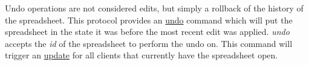 Undo operations are not considered edits, but simply a rollback of the history 
of the spreadsheet. This protocol provides an \hyperref[sec:message:undo]{undo} 
command which will put the spreadsheet in the state it was before the most 
recent edit was applied. \emph{undo} accepts the \emph{id} of the spreadsheet 
to perform the undo on. This command will trigger an \hyperref[sec:message:updates]{update} for all clients 
that currently have the spreadsheet open.
